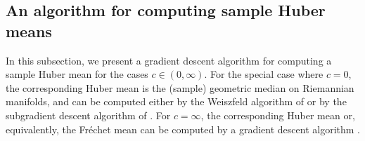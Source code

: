 \documentclass[preprint]{imsart}
\theoremstyle{plain}
\theoremstyle{remark}
\begin{document}



\subsection{An algorithm for computing sample Huber means}

In this subsection, we present a gradient descent algorithm for computing a sample Huber mean for the cases $c \in (0,\infty)$. For the special case where $c = 0$, the corresponding Huber mean is the (sample) geometric median on Riemannian manifolds, and can be computed either by the Weiszfeld algorithm of \cite{fletcher2009geometric} or by the subgradient descent algorithm of \cite{yang2010riemannian}. For $c = \infty$, the corresponding Huber mean or, equivalently, the Fr\'{e}chet mean can be computed by a gradient descent algorithm \citep{ferreira2019gradient}. 
 
\end{document}
